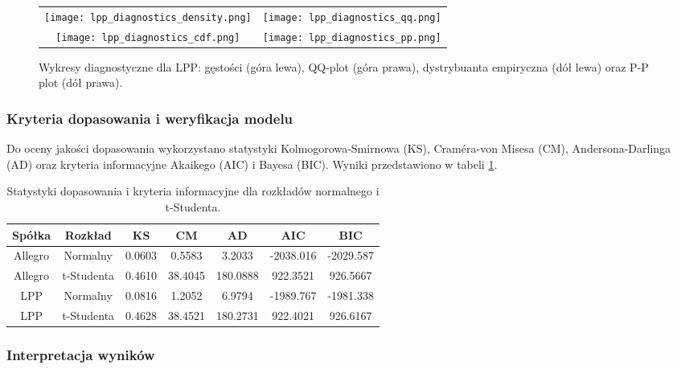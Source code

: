 \documentclass[12pt]{article}
\begin{document}
\begin{figure}[H]
    \centering
    \begin{tabular}{cc}
        \texttt{[image: lpp\_diagnostics\_density.png]} &
        \texttt{[image: lpp\_diagnostics\_qq.png]} \\
        \texttt{[image: lpp\_diagnostics\_cdf.png]} &
        \texttt{[image: lpp\_diagnostics\_pp.png]} \\
    \end{tabular}
    \caption{Wykresy diagnostyczne dla LPP: gęstości (góra lewa), QQ-plot (góra prawa), dystrybuanta empiryczna (dół lewa) oraz P-P plot (dół prawa).}
    \label{fig:lpp_diagnostics}
\end{figure}

\subsubsection{Kryteria dopasowania i weryfikacja modelu}

Do oceny jakości dopasowania wykorzystano statystyki Kolmogorowa-Smirnowa (KS), Craméra-von Misesa (CM), Andersona-Darlinga (AD) oraz kryteria informacyjne Akaikego (AIC) i Bayesa (BIC). Wyniki przedstawiono w tabeli \ref{tab:gof_results}.

\begin{table}[H]
\centering
\begin{tabular}{|c|c|c|c|c|c|c|}
\hline
Spółka & Rozkład & KS & CM & AD & AIC & BIC \\ \hline
Allegro & Normalny & 0.0603 & 0.5583 & 3.2033 & -2038.016 & -2029.587 \\ 
Allegro & t-Studenta & 0.4610 & 38.4045 & 180.0888 & 922.3521 & 926.5667 \\ 
LPP     & Normalny & 0.0816 & 1.2052 & 6.9794 & -1989.767 & -1981.338 \\ 
LPP     & t-Studenta & 0.4628 & 38.4521 & 180.2731 & 922.4021 & 926.6167 \\ \hline
\end{tabular}
\caption{Statystyki dopasowania i kryteria informacyjne dla rozkładów normalnego i t-Studenta.}
\label{tab:gof_results}
\end{table}

\subsubsection{Interpretacja wyników}
\end{document}
